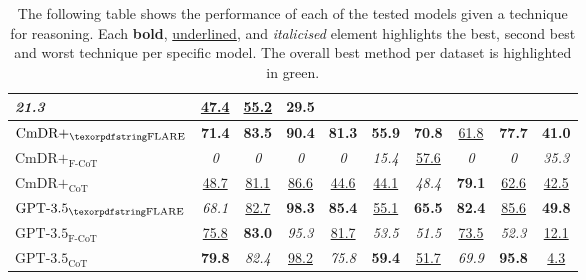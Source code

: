 \begin{table*}[t!]
{\begin{tabular}{@{}lccccccccc@{}}
  \textit{21.3} &
  {\underline{47.4}} &
  \multicolumn{1}{c|}{{\underline{55.2}}} &
  \textbf{29.5} \\ \midrule
\multicolumn{1}{l|}{$\text{CmDR+}_\text{\ours}$} &
  \textbf{71.4} &
  \cellcolor[HTML]{9AFF99}\textbf{83.5} &
  \textbf{90.4} &
  \textbf{81.3} &
  \multicolumn{1}{c|}{\textbf{55.9}} &
  \cellcolor[HTML]{9AFF99}\textbf{70.8} &
  {\underline{61.8}} &
  \multicolumn{1}{c|}{\textbf{77.7}} &
  \textbf{41.0} \\
\multicolumn{1}{l|}{$\text{CmDR+}_\text{F-CoT}$} &
  \textit{0} &
  \textit{0} &
  \textit{0} &
  \textit{0} &
  \multicolumn{1}{c|}{\textit{15.4}} &
  {\underline{57.6}} &
  \textit{0} &
  \multicolumn{1}{c|}{\textit{0}} &
  \textit{35.3} \\
\multicolumn{1}{l|}{$\text{CmDR+}_\text{CoT}$} &
  {\underline{48.7}} &
  {\underline{81.1}} &
  {\underline{86.6}} &
  {\underline{44.6}} &
  \multicolumn{1}{c|}{{\underline{44.1}}} &
  \textit{48.4} &
  \textbf{79.1} &
  \multicolumn{1}{c|}{{\underline{62.6}}} &
  {\underline{42.5}} \\ \midrule
\multicolumn{1}{l|}{$\text{GPT-3.5}_\text{\ours}$} &
  \textit{68.1} &
  {\underline{82.7}} &
  \cellcolor[HTML]{9AFF99}\textbf{98.3} &
  \cellcolor[HTML]{9AFF99}\textbf{85.4} &
  \multicolumn{1}{c|}{{\underline{55.1}}} &
  \textbf{65.5} &
  \cellcolor[HTML]{9AFF99}\textbf{82.4} &
  \multicolumn{1}{c|}{{\underline{85.6}}} &
  \cellcolor[HTML]{9AFF99}\textbf{49.8} \\
\multicolumn{1}{l|}{$\text{GPT-3.5}_\text{F-CoT}$} &
  {\underline{75.8}} &
  \textbf{83.0} &
  \textit{95.3} &
  {\underline{81.7}} &
  \multicolumn{1}{c|}{\textit{53.5}} &
  \textit{51.5} &
  {\underline{73.5}} &
  \multicolumn{1}{c|}{\textit{52.3}} &
  {\underline{12.1}} \\
\multicolumn{1}{l|}{$\text{GPT-3.5}_\text{CoT}$} &
  \cellcolor[HTML]{9AFF99}\textbf{79.8} &
  \textit{82.4} &
  {\underline{98.2}} &
  \textit{75.8} &
  \multicolumn{1}{c|}{\textbf{59.4}} &
  {\underline{51.7}} &
  \textit{69.9} &
  \multicolumn{1}{c|}{\cellcolor[HTML]{9AFF99}\textbf{95.8}} &
  {\underline{4.3}} \\ \bottomrule
\end{tabular}
}
\caption{The following table shows the performance of each of the tested models given a technique for reasoning. Each \textbf{bold}, \underline{underlined}, and \textit{italicised} element highlights the best, second best and worst technique per specific model. The overall best method per dataset is highlighted in \colorbox[HTML]{9AFF99}{green}.}
\label{tab:results_main}
\end{table*}
